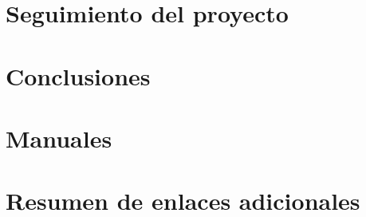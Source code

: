 \documentclass[openright,twoside,10pt]{book}
\begin{document}
\chapter{Seguimiento del proyecto}\label{cap:seguimiento}


\chapter{Conclusiones}\label{cap.conclusiones}


\appendix

\chapter{Manuales}\label{aped.A}


\chapter{Resumen de enlaces adicionales}\label{aped.B}






\cleardoublepage
{}

 


\end{document}
